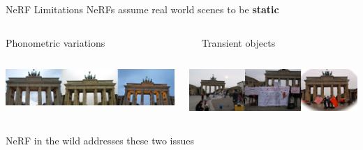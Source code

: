 \documentclass[aspectratio=1610]{beamer}
\begin{document}
\begin{frame}{NeRF Limitations}
    NeRFs assume real world scenes to be \textbf{static}
    \vspace{1.5cm}
    \begin{columns}[t]
        \begin{column}{.4\textwidth}
            Phonometric variations\\
        \end{column}
        \begin{column}{.4\textwidth}
            Transient objects\\
        \end{column}
    \end{columns}
    \begin{columns}
        \begin{column}{.4\textwidth}
            \begin{center}
                \includegraphics[width=\textwidth]{issues-var.png}
            \end{center}
        \end{column}
        \begin{column}{.4\textwidth}
            \begin{center}
                \includegraphics[width=\textwidth]{issues-transient.png}
            \end{center}
        \end{column}
    \end{columns}
    \vspace{1.5cm}
    \pause
    NeRF in the wild addresses these two issues
\end{frame}
\end{document}
